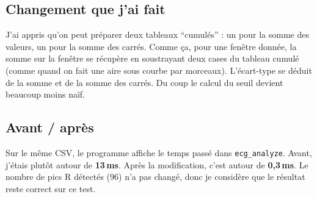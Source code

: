 \documentclass[a4paper,12pt]{article}
\begin{document}
\subsection{Changement que j'ai fait}
J'ai appris qu'on peut préparer deux tableaux ``cumulés'' : un pour la somme des valeurs, un pour la somme des carrés. Comme ça, pour une fenêtre donnée, la somme sur la fenêtre se récupère en soustrayant deux cases du tableau cumulé (comme quand on fait une aire sous courbe par morceaux). L'écart-type se déduit de la somme et de la somme des carrés. Du coup le calcul du seuil devient beaucoup moins naïf.

\subsection{Avant / après}
Sur le même CSV, le programme affiche le temps passé dans \texttt{ecg\_analyze}. Avant, j'étais plutôt autour de \textbf{13\,ms}. Après la modification, c'est autour de \textbf{0{,}3\,ms}. Le nombre de pics R détectés (96) n'a pas changé, donc je considère que le résultat reste correct sur ce test.
\end{document}
